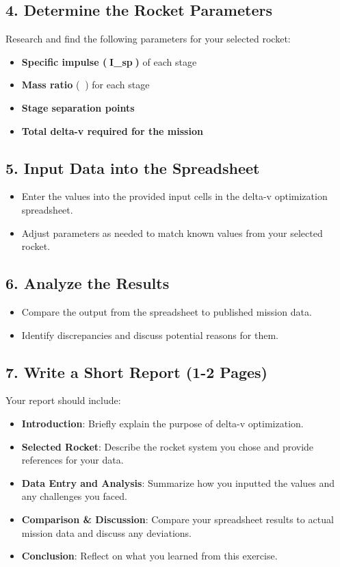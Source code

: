\documentclass[a4paper,12pt]{article}
\begin{document}
\subsection{4. Determine the Rocket Parameters}
Research and find the following parameters for your selected rocket:
\begin{itemize}
    \item \textbf{Specific impulse (I_{sp})} of each stage
    \item \textbf{Mass ratio} () for each stage
    \item \textbf{Stage separation points}
    \item \textbf{Total delta-v required for the mission}
\end{itemize}

\subsection{5. Input Data into the Spreadsheet}
\begin{itemize}
    \item Enter the values into the provided input cells in the delta-v optimization spreadsheet.
    \item Adjust parameters as needed to match known values from your selected rocket.
\end{itemize}

\subsection{6. Analyze the Results}
\begin{itemize}
    \item Compare the output from the spreadsheet to published mission data.
    \item Identify discrepancies and discuss potential reasons for them.
\end{itemize}

\subsection{7. Write a Short Report (1-2 Pages)}
Your report should include:
\begin{itemize}
    \item \textbf{Introduction}: Briefly explain the purpose of delta-v optimization.
    \item \textbf{Selected Rocket}: Describe the rocket system you chose and provide references for your data.
    \item \textbf{Data Entry and Analysis}: Summarize how you inputted the values and any challenges you faced.
    \item \textbf{Comparison \& Discussion}: Compare your spreadsheet results to actual mission data and discuss any deviations.
    \item \textbf{Conclusion}: Reflect on what you learned from this exercise.
\end{itemize}
\end{document}
